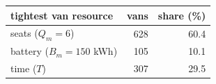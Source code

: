 \begin{tabular}{lrr}\toprule
tightest van resource & vans & share (\%) \\ \midrule
seats ($Q_m=6$) & 628 & 60.4 \\
battery ($B_m=150$ kWh) & 105 & 10.1 \\
time ($T$) & 307 & 29.5 \\
\bottomrule\end{tabular}
